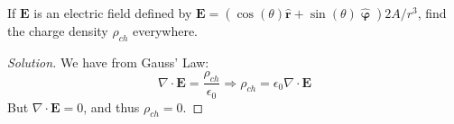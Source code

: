 \documentclass[crop=false,class=article,oneside]{standalone}
\begin{document}
    \begin{problem}[Wangsness 4-12]
        If $\mathbf{E}$ is an electric field defined by
        $\mathbf{E}%
         =(\cos(\theta)\hat{\mathbf{r}}%
         +\sin(\theta)\hat{\boldsymbol{\upvarphi}})2A/r^{3}$,
        find the charge density $\rho_{ch}$ everywhere.
    \end{problem}
    \begin{proof}[Solution]
        We have from Gauss' Law:
        \begin{equation*}
            \nabla\cdot\mathbf{E}=\frac{\rho_{ch}}{\epsilon_{0}}
            \Rightarrow\rho_{ch}=\epsilon_{0}\nabla\cdot\mathbf{E}
        \end{equation*}
        But $\nabla\cdot\mathbf{E}=0$, and thus $\rho_{ch}=0$.
    \end{proof}
\end{document}
